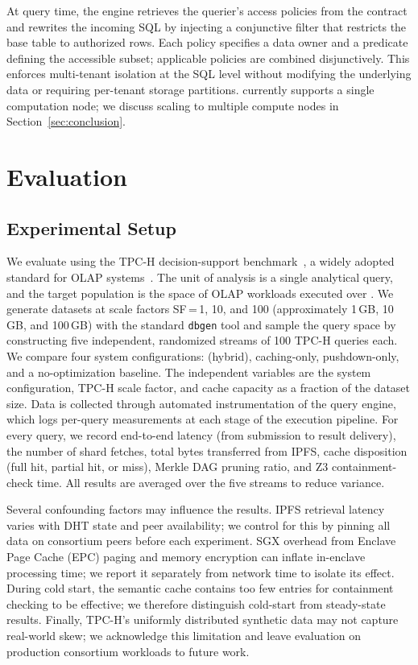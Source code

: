 At query time, the engine retrieves the querier's access policies from the contract and rewrites the incoming SQL by injecting a conjunctive filter that restricts the base table to authorized rows.
Each policy specifies a data owner and a predicate defining the accessible subset; applicable policies are combined disjunctively.
This enforces multi-tenant isolation at the SQL level without modifying the underlying data or requiring per-tenant storage partitions.
\ours{} currently supports a single computation node; we discuss scaling to multiple compute nodes in Section~\ref{sec:conclusion}.

\section{Evaluation}
\label{sec:eval}
\subsection{Experimental Setup}
We evaluate \ours{} using the TPC-H decision-support benchmark~\cite{tpch}, a widely adopted standard for OLAP systems~\cite{yang2021flexpushdowndb}. The unit of analysis is a single analytical query, and the target population is the space of OLAP workloads executed over \ours{}. We generate datasets at scale factors SF\,=\,1, 10, and 100 (approximately 1\,GB, 10\,GB, and 100\,GB) with the standard \texttt{dbgen} tool and sample the query space by constructing five independent, randomized streams of 100 TPC-H queries each. We compare four system configurations: \ours{} (hybrid), caching-only, pushdown-only, and a no-optimization baseline. The independent variables are the system configuration, TPC-H scale factor, and cache capacity as a fraction of the dataset size. Data is collected through automated instrumentation of the \ours{} query engine, which logs per-query measurements at each stage of the execution pipeline. For every query, we record end-to-end latency (from submission to result delivery), the number of shard fetches, total bytes transferred from IPFS, cache disposition (full hit, partial hit, or miss), Merkle DAG pruning ratio, and Z3 containment-check time. All results are averaged over the five streams to reduce variance.

Several confounding factors may influence the results. IPFS retrieval latency varies with DHT state and peer availability; we control for this by pinning all data on consortium peers before each experiment. SGX overhead from Enclave Page Cache (EPC) paging and memory encryption can inflate in-enclave processing time; we report it separately from network time to isolate its effect. During cold start, the semantic cache contains too few entries for containment checking to be effective; we therefore distinguish cold-start from steady-state results. Finally, TPC-H's uniformly distributed synthetic data may not capture real-world skew; we acknowledge this limitation and leave evaluation on production consortium workloads to future work.
